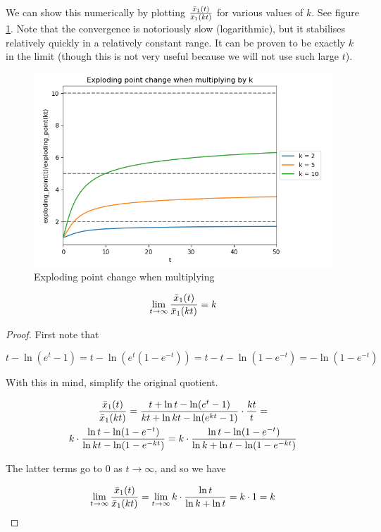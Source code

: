 \documentclass[12pt,a4paper]{article}
\begin{document}
We can show this numerically by plotting ${{{\bar{x}}_1(t)} \over {{\bar{x}}_1(kt)}}$ for various values of $k$. See figure \ref{fig_exploding_point_evolution}. Note that the convergence is notoriously slow (logarithmic), but it stabilises relatively quickly in a relatively constant range. It can be proven to be exactly $k$ in the limit (though this is not very useful because we will not use such large $t$).

\begin{figure}
\caption{\label{fig_exploding_point_evolution}Exploding point change when multiplying}
\centering
\includegraphics[width=\textwidth]{exploding_point_evolution.png}
\end{figure}

\begin{theorem}
\begin{equation}
\lim_{t \rightarrow \infty} {{{\bar{x}}_1(t)} \over {{\bar{x}}_1(kt)}} = k
\end{equation}
\end{theorem}

\begin{proof}
First note that

\begin{equation}
t - \ln(e^t - 1) = t - \ln(e^t(1 - e^{-t})) = t - t - \ln(1 - e^{-t}) = - \ln(1-e^{-t})
\end{equation}

With this in mind, simplify the original quotient.

\begin{multline}
{{{\bar{x}}_1(t)} \over {{\bar{x}}_1(kt)}} = {{t + \ln t - \ln(e^t - 1)} \over {kt + \ln kt - \ln(e^{kt} - 1)}} \cdot {{kt} \over {t}} =\\
k \cdot {{\ln t - \ln(1-e^{-t})} \over {\ln kt - \ln(1-e^{-kt})}} = k \cdot {{\ln t - \ln(1-e^{-t})} \over {\ln k + \ln t - \ln(1-e^{-kt})}}\\
\end{multline}

The latter terms go to 0 as $t \rightarrow \infty$, and so we have

\begin{equation}
\lim_{t \rightarrow \infty} {{{\bar{x}}_1(t)} \over {{\bar{x}}_1(kt)}} = \lim_{t \rightarrow \infty} k \cdot {{\ln t} \over {\ln k + \ln t}} = k \cdot 1 = k
\end{equation}
\end{proof}
\end{document}

